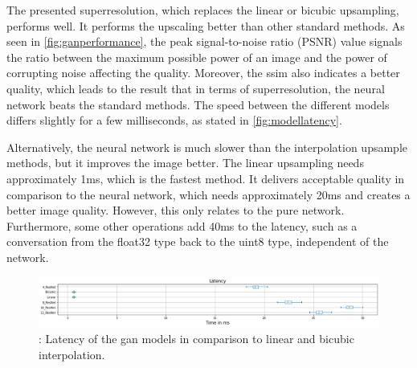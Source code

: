 \par
The presented superresolution, which replaces the linear or bicubic upsampling, performs well. It performs the upscaling better than other standard methods. As seen in \autoref{fig:ganperformance}, the peak signal-to-noise ratio (PSNR) value signals the ratio between the maximum possible power of an image and the power of corrupting noise affecting the quality. Moreover, the \gls{ssim} also indicates a better quality, which leads to the result that in terms of superresolution, the neural network beats the standard methods. The speed between the different models differs slightly for a few milliseconds, as stated in \autoref{fig:modellatency}.
\par
Alternatively, the neural network is much slower than the interpolation upsample methods, but it improves the image better. The linear upsampling needs approximately 1ms, which is the fastest method. It delivers acceptable quality in comparison to the neural network, which needs approximately 20ms and creates a better image quality. However, this only relates to the pure network. Furthermore, some other operations add 40ms to the latency, such as a conversation from the float32 type back to the uint8 type, independent of the network.


\begin{figure}[htbp]
    \includegraphics[width=\textwidth,height=\textheight,keepaspectratio]{logos/latencyUpscaling.png}
    \caption{: Latency of the \gls{gan} models in comparison to linear and bicubic interpolation.}
    \label{fig:modellatency}
\end{figure}

